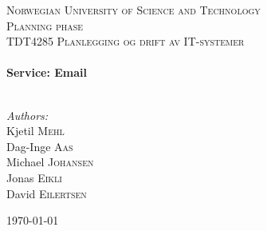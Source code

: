 
\begin{titlepage}

\begin{center}
 

\textsc{\LARGE Norwegian University of Science and Technology}\\[1.5cm]

 
\textsc{\Large Planning phase}\\[0.5cm]

\textsc{\large TDT4285 Planlegging og drift av IT-systemer}\\[0.5cm]
 
 
\HRule \\[0.4cm]
{ \huge \bfseries Service: Email}\\[0.4cm]
 
\HRule \\[1.5cm]
 

\begin{center} \Large
\emph{Authors:}\\
Kjetil \textsc{Mehl}\\
Dag-Inge \textsc{Aas}\\
Michael \textsc{Johansen}\\
Jonas \textsc{Eikli}\\
David \textsc{Eilertsen}\\[3cm]
\end{center}
 

{\large \today}\\[4cm] %
 
\vfill
\end{center}

\end{titlepage}
